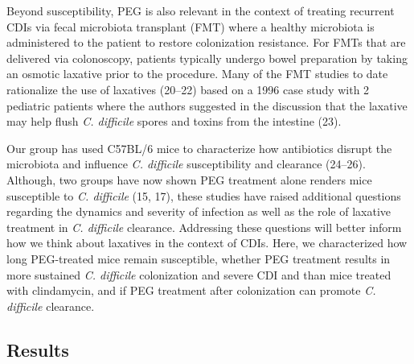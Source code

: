 \documentclass[
  11pt,
]{article}
\begin{document}
Beyond susceptibility, PEG is also relevant in the context of treating
recurrent CDIs via fecal microbiota transplant (FMT) where a healthy
microbiota is administered to the patient to restore colonization
resistance. For FMTs that are delivered via colonoscopy, patients
typically undergo bowel preparation by taking an osmotic laxative prior
to the procedure. Many of the FMT studies to date rationalize the use of
laxatives (20--22) based on a 1996 case study with 2 pediatric patients
where the authors suggested in the discussion that the laxative may help
flush \emph{C. difficile} spores and toxins from the intestine (23).

Our group has used C57BL/6 mice to characterize how antibiotics disrupt
the microbiota and influence \emph{C. difficile} susceptibility and
clearance (24--26). Although, two groups have now shown PEG treatment
alone renders mice susceptible to \emph{C. difficile} (15, 17), these
studies have raised additional questions regarding the dynamics and
severity of infection as well as the role of laxative treatment in
\emph{C. difficile} clearance. Addressing these questions will better
inform how we think about laxatives in the context of CDIs. Here, we
characterized how long PEG-treated mice remain susceptible, whether PEG
treatment results in more sustained \emph{C. difficile} colonization and
severe CDI and than mice treated with clindamycin, and if PEG treatment
after colonization can promote \emph{C. difficile} clearance.

\hypertarget{results}{%
\subsection{Results}\label{results}}
\end{document}
